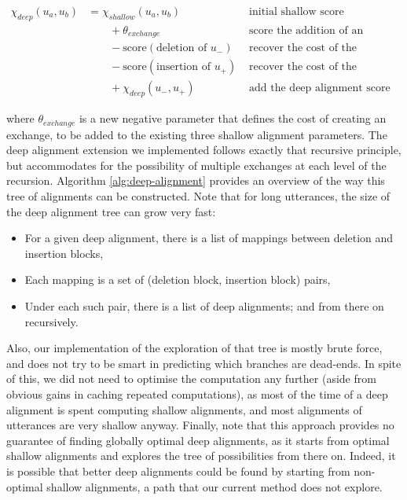 \begin{align}
  \chi_{deep}(u_a, u_b) & = \chi_{shallow}(u_a, u_b) & & \text{initial shallow score} \nonumber \\
              &\qquad {} + \theta_{exchange} & & \text{score the addition of an exchange operation} \nonumber \\
              &\qquad {} - \text{score}(\text{deletion of }u_-) & & \text{recover the cost of the deletion block} \nonumber \\
              &\qquad {} - \text{score}(\text{insertion of }u_+) & & \text{recover the cost of the insertion block} \nonumber \\
              &\qquad {} + \chi_{deep}(u_-, u_+) & & \text{add the deep alignment score of the exchange} \label{eq:exchange-score}
\end{align}

where \(\theta_{exchange}\) is a new negative parameter that defines the
cost of creating an exchange, to be added to the existing three shallow
alignment parameters. The deep alignment extension we implemented
follows exactly that recursive principle, but accommodates for the
possibility of multiple exchanges at each level of the recursion.
Algorithm \ref{alg:deep-alignment} provides an overview of the way this
tree of alignments can be constructed. Note that for long utterances,
the size of the deep alignment tree can grow very fast:

\begin{itemize}
\item
  For a given deep alignment, there is a list of mappings between
  deletion and insertion blocks,
\item
  Each mapping is a set of (deletion block, insertion block) pairs,
\item
  Under each such pair, there is a list of deep alignments; and from
  there on recursively.
\end{itemize}



Also, our implementation of the exploration of that tree is mostly brute
force, and does not try to be smart in predicting which branches are
dead-ends. In spite of this, we did not need to optimise the computation
any further (aside from obvious gains in caching repeated computations),
as most of the time of a deep alignment is spent computing shallow
alignments, and most alignments of utterances are very shallow anyway.
Finally, note that this approach provides no guarantee of finding
globally optimal deep alignments, as it starts from optimal shallow
alignments and explores the tree of possibilities from there on. Indeed,
it is possible that better deep alignments could be found by starting
from non-optimal shallow alignments, a path that our current method does
not explore.

